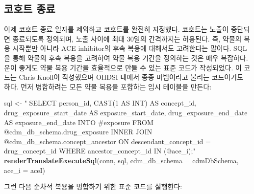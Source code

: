 \documentclass[10.5pt]{book}
\newenvironment{Shaded}{\begin{snugshade}}{\end{snugshade}}
\newcommand{\KeywordTok}[1]{\textcolor[rgb]{0.13,0.29,0.53}{\textbf{#1}}}
\newcommand{\DataTypeTok}[1]{\textcolor[rgb]{0.13,0.29,0.53}{#1}}
\newcommand{\StringTok}[1]{\textcolor[rgb]{0.31,0.60,0.02}{#1}}
\newcommand{\NormalTok}[1]{#1}
\theoremstyle{definition}
\theoremstyle{definition}
\theoremstyle{definition}
\theoremstyle{remark}
\begin{document}
\subsection{코호트 종료}\label{-}

이제 코호트 종료 일자를 제외하고 코호트를 완전히 지정했다. 코호트는
노출이 중단되면 종료되도록 정의되며, 노출 사이에 최대 30일의 간격까지는
허용된다. 즉, 약물의 복용 시작뿐만 아니라 ACE inhibitor의 후속 복용에
대해서도 고려한다는 말이다. SQL을 통해 약물의 후속 복용을 고려하여 약물
복용 기간을 정의하는 것은 매우 복잡하다. 운이 좋게도 약물 복용 기간을
효율적으로 만들 수 있는 표준 코드가 작성되었다. 이 코드는 Chris Knoll이
작성했으며 OHDSI 내에서 종종 마법이라고 불리는 코드이기도 하다. 먼저
병합하려는 모든 약물 복용을 포함하는 임시 테이블을 만든다:

\begin{Shaded}
\begin{Highlighting}[]
\NormalTok{sql <-}\StringTok{ "}
\StringTok{  SELECT person_id,}
\StringTok{    CAST(1 AS INT) AS concept_id,}
\StringTok{    drug_exposure_start_date AS exposure_start_date,}
\StringTok{    drug_exposure_end_date AS exposure_end_date}
\StringTok{  INTO #exposure}
\StringTok{  FROM @cdm_db_schema.drug_exposure}
\StringTok{  INNER JOIN @cdm_db_schema.concept_ancestor}
\StringTok{    ON descendant_concept_id = drug_concept_id}
\StringTok{  WHERE ancestor_concept_id IN (@ace_i);"}
\KeywordTok{renderTranslateExecuteSql}\NormalTok{(conn,}
\NormalTok{                          sql,}
                          \DataTypeTok{cdm_db_schema =}\NormalTok{ cdmDbSchema,}
                          \DataTypeTok{ace_i =}\NormalTok{ aceI)}
\end{Highlighting}
\end{Shaded}

그런 다음 순차적 복용을 병합하기 위한 표준 코드를 실행한다:
\end{document}
